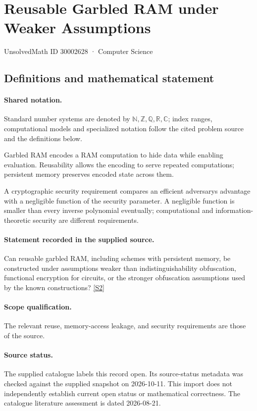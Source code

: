 \documentclass[11pt]{article}
\newcommand{\sref}[2]{\hyperlink{source:#1:#2}{[S#2]}}
\begin{document}
\setcounter{section}{30002627}
\section{Reusable Garbled RAM under Weaker Assumptions}\label{30002628}
{\small\sffamily UnsolvedMath ID 30002628 · Computer Science}
\subsection{Definitions and mathematical statement}

\paragraph{Shared notation.}Standard number systems are denoted by $\mathbb N,\mathbb Z,\mathbb Q,\mathbb R,\mathbb C$; index ranges, computational models and specialized notation follow the cited problem source and the definitions below.


Garbled RAM encodes a RAM computation to hide data while enabling evaluation. Reusability allows the encoding to serve repeated computations; persistent memory preserves encoded state across them.

A cryptographic security requirement compares an efficient adversary\textquotesingle s advantage with a negligible function of the security parameter. A negligible function is smaller than every inverse polynomial eventually; computational and information-theoretic security are different requirements.
\paragraph{Statement recorded in the supplied source.}
Can reusable garbled RAM, including schemes with persistent memory, be constructed under assumptions weaker than indistinguishability obfuscation, functional encryption for circuits, or the stronger obfuscation assumptions used by the known constructions? \sref{30002628}{2}
\paragraph{Scope qualification.}
The relevant reuse, memory-access leakage, and security requirements are those of the source.
\paragraph{Source status.}
The supplied catalogue labels this record open. Its source-status metadata was checked against the supplied snapshot on 2026-10-11. This import does not independently establish current open status or mathematical correctness. The catalogue literature assessment is dated 2026-08-21.
\end{document}
